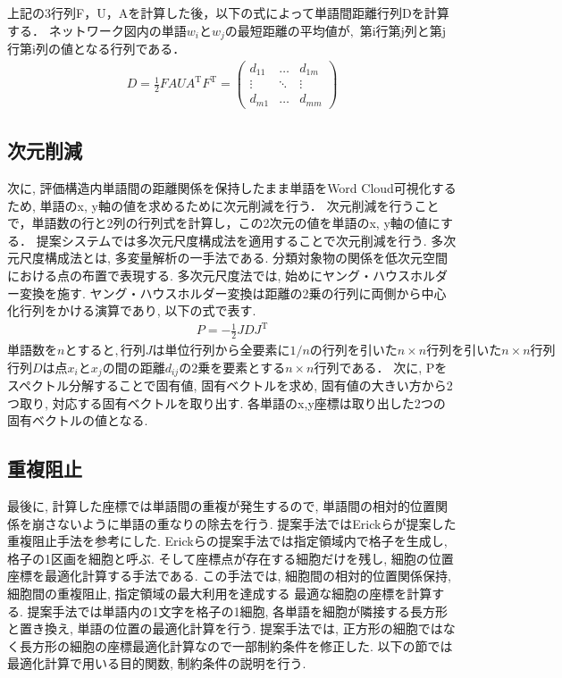 \documentclass[syuuron]{kuee}
\begin{document}
				
			上記の3行列F，U，Aを計算した後，以下の式によって単語間距離行列Dを計算する．
			$ネットワーク図内の単語w_iとw_jの最短距離の平均値が, $
			第i行第j列と第j行第i列の値となる行列である．
			\begin{eqnarray}
			 D = \frac{1}{2} FAUA^{\mathrm{T}}F^{\mathrm{T}}
			   = \left(
			    \begin{array}{cccc}
			    	d_{11} & \ldots & d_{1m} \\
			    	\vdots & \ddots & \vdots \\
			    	d_{m1} & \ldots & d_{mm}
				\end{array}
			 \right)
			\end{eqnarray}	
			
		\subsection{次元削減}
			次に, 評価構造内単語間の距離関係を保持したまま単語をWord Cloud可視化するため, 単語のx, y軸の値を求めるために次元削減を行う．
			次元削減を行うことで，単語数の行と2列の行列式を計算し，この2次元の値を単語のx, y軸の値にする．
			提案システムでは多次元尺度構成法を適用することで次元削減を行う. 
			多次元尺度構成法とは, 多変量解析の一手法である.  分類対象物の関係を低次元空間における点の布置で表現する. 
			多次元尺度法では, 始めにヤング・ハウスホルダー変換を施す. 
			ヤング・ハウスホルダー変換は距離の2乗の行列に両側から中心化行列をかける演算であり, 以下の式で表す. 
			\begin{eqnarray}
				P = - \frac{1}{2} JDJ^{\mathrm{T}}
			\end{eqnarray}
			$単語数をnとすると, 行列Jは単位行列から全要素に1/nの行列を引いたn \times n行列を引いたn \times n行列$
			$行列Dは点 x_i と x_j の間の距離 d_{ij} の2乗を要素とするn×n行列である．$
			次に, Pをスペクトル分解することで固有値, 固有ベクトルを求め, 固有値の大きい方から2つ取り, 対応する固有ベクトルを取り出す. 
			各単語のx,y座標は取り出した2つの固有ベクトルの値となる. 
			
		\subsection{重複阻止}
			最後に, 計算した座標では単語間の重複が発生するので, 単語間の相対的位置関係を崩さないように単語の重なりの除去を行う. 
			提案手法ではErickらが提案した重複阻止手法を参考にした\cite{or2}. 
			Erickらの提案手法では指定領域内で格子を生成し, 格子の1区画を細胞と呼ぶ. 
			そして座標点が存在する細胞だけを残し, 細胞の位置座標を最適化計算する手法である. 
			この手法では, 細胞間の相対的位置関係保持, 細胞間の重複阻止, 指定領域の最大利用を達成する
			最適な細胞の座標を計算する. 
			提案手法では単語内の1文字を格子の1細胞, 各単語を細胞が隣接する長方形と置き換え, 単語の位置の最適化計算を行う. 
			提案手法では, 正方形の細胞ではなく長方形の細胞の座標最適化計算なので一部制約条件を修正した. 
			以下の節では最適化計算で用いる目的関数, 制約条件の説明を行う. 
			
\end{document}
